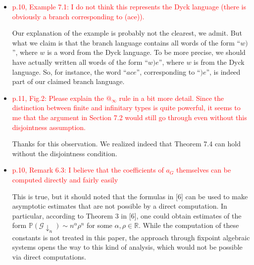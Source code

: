 \documentclass[a4paper,10pt]{article}
\newcommand{\red}[1]{\textcolor{red}{#1}}
\begin{document}
\begin{itemize}
\begin{itemize}
	\item\red{ p.10, Example 7.1: I do not think this represents the Dyck language (there is obviously a branch corresponding to (ace)).
}

Our explanation of the example is probably not the clearest, we admit. But what we claim is that the branch language contains all words of the form ``$w )$'', where $w$ is a word from the Dyck language. To be more precise, we should have actually written all words of the form ``$w ) e$'', where $w$ is from the Dyck language. So, for instance, the word ``$ace$'', corresponding to ``$)e$'', is indeed part of our claimed branch language.

\item \red{ p.11, Fig.2: Please explain the $@_{\infty}$ rule in a bit more detail. Since the distinction between finite and infinitary types is quite powerful, it seems to me that the argument in Section 7.2 would still go through even without this disjointness assumption.}

Thanks for this observation. We realized indeed that Theorem 7.4 can hold without the disjointness condition.

\item\red{p.10, Remark 6.3: I believe that the coefficients of $a_G$ themselves can be computed directly and fairly easily}
	
	This is true, but it should noted that the formulas in [6] can be used to make asymptotic estimates that are not possible by a direct computation. In particular, according to Theorem 3 in [6], one could obtain estimates of the form $\mathbb{P}(\mathcal{G}\downarrow_n) \sim n^\alpha \rho^n $ for some $\alpha, \rho \in \mathbb{R}$. While the computation of these constants is not treated in this paper, the approach through fixpoint algebraic systems opens the way to this kind of analysis, which would not be possible via direct computations.
	

\end{itemize}

\end{itemize}
\end{document}
